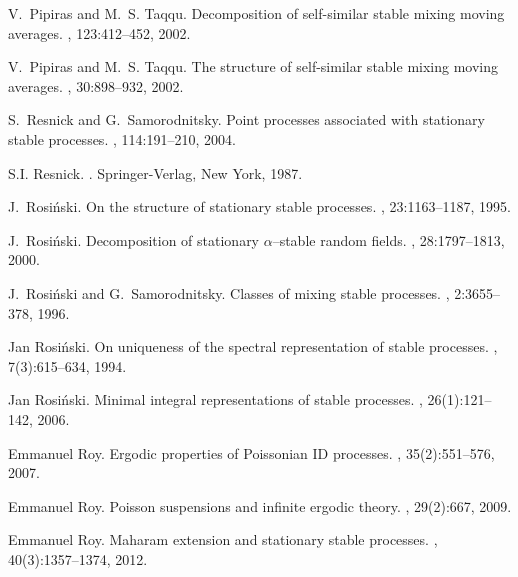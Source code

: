 \documentclass[12pt]{amsart}
\begin{document}
\begin{thebibliography}{10}
	V.~Pipiras and M.~S. Taqqu.
	\newblock Decomposition of self-similar stable mixing moving averages.
	, 123:412--452, 2002.
	
	V.~Pipiras and M.~S. Taqqu.
	\newblock The structure of self-similar stable mixing moving averages.
	, 30:898--932, 2002.
	
	S.~Resnick and G.~Samorodnitsky.
	\newblock Point processes associated with stationary stable processes.
	, 114:191--210,
	2004.
	
	S.I. Resnick.
	.
	\newblock Springer-Verlag, New York, 1987.
	
	J.~Rosi\'nski.
	\newblock On the structure of stationary stable processes.
	, 23:1163--1187, 1995.
	
	J.~Rosi\'nski.
	\newblock Decomposition of stationary $\alpha$--stable random fields.
	, 28:1797--1813, 2000.
	
	J.~Rosi\'nski and G.~Samorodnitsky.
	\newblock Classes of mixing stable processes.
	, 2:3655--378, 1996.
	
	Jan Rosi{\'n}ski.
	\newblock On uniqueness of the spectral representation of stable processes.
	, 7(3):615--634, 1994.
	
	Jan Rosi{\'n}ski.
	\newblock Minimal integral representations of stable processes.
	, 26(1):121--142, 2006.
	
	Emmanuel Roy.
	\newblock Ergodic properties of {P}oissonian {ID} processes.
	, 35(2):551--576, 2007.
	
	Emmanuel Roy.
	\newblock Poisson suspensions and infinite ergodic theory.
	, 29(2):667, 2009.
	
	Emmanuel Roy.
	\newblock Maharam extension and stationary stable processes.
	, 40(3):1357--1374, 2012.
	

\end{thebibliography}
\end{document}
